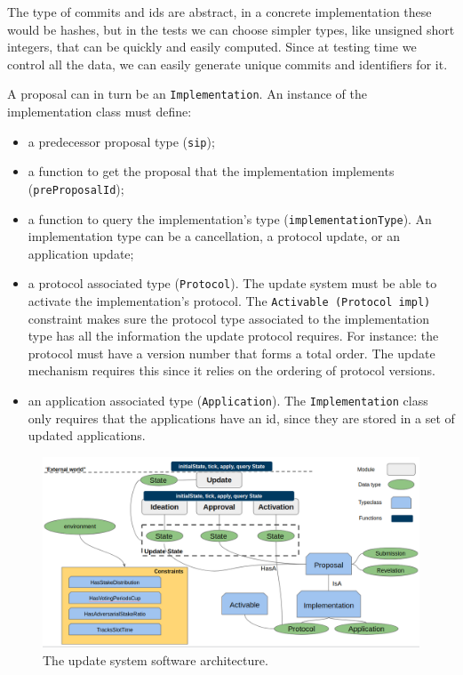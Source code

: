 The type of commits and ids are abstract, in a concrete implementation these
would be hashes, but in the tests we can choose simpler types, like unsigned
short integers, that can be quickly and easily computed. Since at testing time
we control all the data, we can easily generate unique commits and identifiers
for it.

A proposal can in turn be an \texttt{Implementation}. An instance of the
implementation class must define:
\begin{itemize}
	\item a predecessor proposal type (\texttt{sip});
	\item a function to get the proposal that the implementation implements
	(\texttt{preProposalId});
	\item a function to query the implementation's type
	(\texttt{implementationType}). An implementation type can be a cancellation,
	a protocol update, or an application update;
	\item a protocol associated type (\texttt{Protocol}). The update system 
	must be
	able to activate the implementation's protocol. The \texttt{Activable
		(Protocol impl)} constraint makes sure the protocol type associated to 
		the
	implementation type has all the information the update protocol requires. 
	For
	instance: the protocol must have a version number that forms a total order.
	The update mechanism requires this since it relies on the ordering of
	protocol versions.
	\item an application associated type (\texttt{Application}). The
	\texttt{Implementation} class only requires that the applications have an 
	id,
	since they are stored in a set of updated applications.
\end{itemize}

\begin{figure}[h!] %
	\centering
	\includegraphics[width=0.8\columnwidth,
	keepaspectratio]{figures/update-system-sw-architecture.png}
	\caption{The update system software architecture.}
	\label{fig:upd-system-sw-architecture}
\end{figure}


